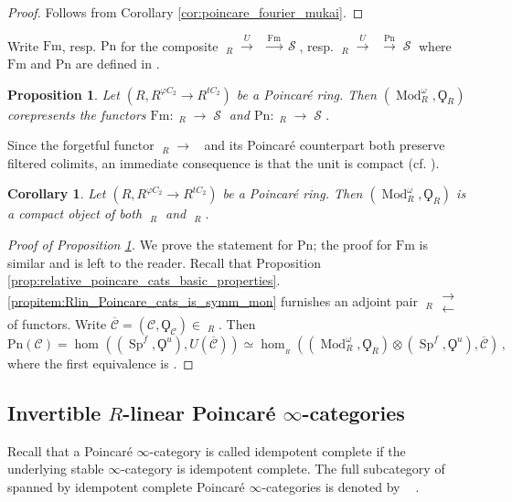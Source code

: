 \documentclass{article}
\DeclareMathOperator{\Cath}{Cat^h_\infty} %
\DeclareMathOperator{\Catp}{Cat^p_\infty} %
\DeclareMathOperator{\Catpidem}{Cat^p_{\infty, idem}} %
\DeclareMathOperator{\Mod}{Mod} %
\DeclareMathOperator{\Spectra}{Sp} %
\DeclareMathOperator{\Spaces}{\mathcal{S}} %
\newcommand{\rlarrows}{\mathrel{\substack{\textstyle\longrightarrow\\[-0.6ex]
                                            \textstyle\longleftarrow}}}
\newtheorem{proposition}[equation]{Proposition}
\newtheorem{corollary}[equation]{Corollary}
\theoremstyle{definition}
\begin{document}
\begin{proof}
    Follows from Corollary \ref{cor:poincare_fourier_mukai}. 
\end{proof}
Write $ \mathrm{Fm} $, resp. $ \mathrm{Pn} $ for the composite $ \Cath_R \xrightarrow{U} \Catp \xrightarrow{\mathrm{Fm}} \Spaces $, resp. $ \Catp_R \xrightarrow{U} \Catp \xrightarrow{\mathrm{Pn}} \Spaces $ where $ \mathrm{Fm} $ and $ \mathrm{Pn} $ are defined in \cite[Definitions 2.1.1, 2.1.3]{CDHHLMNNSI}. 
\begin{proposition}\label{prop:forms_are_corepresented}
    Let $ (R, R^{\varphi C_2} \to R^{tC_2}) $ be a Poincaré ring. 
    Then $ \left(\Mod_R^\omega, \Qoppa_R \right) $ corepresents the functors $ \mathrm{Fm} \colon \Cath_R \to \Spaces $ and $ \mathrm{Pn} \colon \Catp_R \to \Spaces $.
\end{proposition}
Since the forgetful functor $ \Cath_R \to \Cath $ and its Poincaré counterpart both preserve filtered colimits, an immediate consequence is that the unit is compact (cf. \cite[Proposition 6.1.8]{CDHHLMNNSI}).
\begin{corollary}\label{cor:unit_is_compact}
    Let $ (R, R^{\varphi C_2} \to R^{tC_2}) $ be a Poincaré ring. 
    Then $ \left(\Mod_R^\omega, \Qoppa_R \right) $ is a compact object of both $ \Cath_R $ and $ \Catp_R $.  
\end{corollary}
\begin{proof}[Proof of Proposition \ref{prop:forms_are_corepresented}]
    We prove the statement for $ \mathrm{Pn} $; the proof for $ \mathrm{Fm} $ is similar and is left to the reader. 
    Recall that Proposition \ref{prop:relative_poincare_cats_basic_properties}.\ref{propitem:Rlin_Poincare_cats_is_symm_mon} furnishes an adjoint pair $ \Catp_R \rlarrows \Catp $ of functors. 
    Write $ \overline{\mathcal{C}} = (\mathcal{C},\Qoppa_{\mathcal{C}}) \in \Catpidem_R $. 
    Then
    \begin{equation*}
        \mathrm{Pn}(\mathcal{C}) = \hom_{\Catp}\left((\Spectra^f,\Qoppa^u), U(\overline{\mathcal{C}})\right) \simeq \hom_{\Catp_R}\left(\left(\Mod_R^\omega,\Qoppa_R\right)\otimes(\Spectra^f,\Qoppa^u), \overline{\mathcal{C}}\right) \,,
    \end{equation*}
    where the first equivalence is \cite[Proposition 4.1.3]{CDHHLMNNSI}. 
\end{proof}

\subsection{Invertible \texorpdfstring{$ R $}{R}-linear Poincaré \texorpdfstring{$\infty$}{∞}-categories}\label{subsection:invertible_relative_Poincare_cats}
Recall that a Poincaré $\infty$-category is called idempotent complete if the underlying stable $\infty$-category is idempotent complete. The full subcategory of $\Catp$ spanned by idempotent complete Poincaré $\infty$-categories is denoted by $\Catpidem$ \cite[Definition 1.3.2]{CDHHLMNNSII}.
\end{document}
